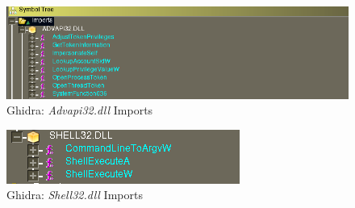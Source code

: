 \documentclass[10pt,a4paper]{article}
\begin{document}
\begin{figure}[!htbp]%
	\centering
	\includegraphics[width=\columnwidth]{pics/importsAdvapi32.png}
	\caption{Ghidra: \textit{Advapi32.dll} Imports}
	\label{importsAdvapi32}
\end{figure}

\begin{figure}[!htbp]%
	\centering
	\includegraphics[width=\columnwidth]{pics/importsShell32.png}
	\caption{Ghidra: \textit{Shell32.dll} Imports}
	\label{importsShell32}
\end{figure}

\newpage
\printbibliography
\end{document}
